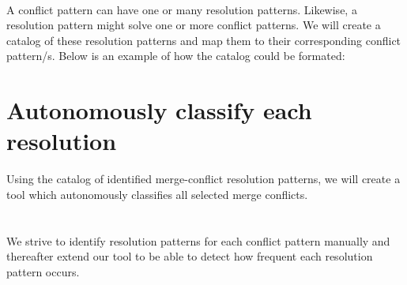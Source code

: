 \paragraph*{}
A conflict pattern can have one or many resolution patterns. Likewise, a resolution pattern might solve one or more conflict patterns. We will create a catalog of these resolution patterns and map them to their corresponding conflict pattern/s. Below is an example of how the catalog could be formated:
\section{Autonomously classify each resolution}
Using the catalog of identified merge-conflict resolution patterns, we will create a tool which autonomously classifies all selected merge conflicts. 
\section{}

We strive to identify resolution patterns for each conflict pattern manually and thereafter extend our tool to be able to detect how frequent each resolution pattern occurs.